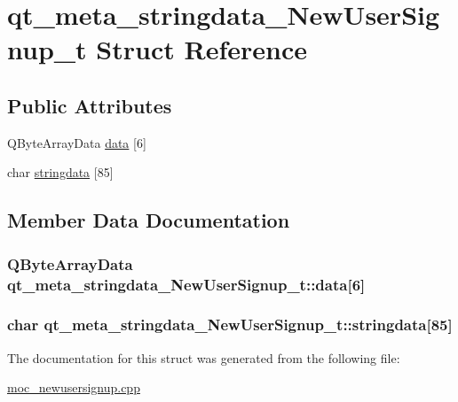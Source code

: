 \hypertarget{structqt__meta__stringdata__NewUserSignup__t}{\section{qt\-\_\-meta\-\_\-stringdata\-\_\-\-New\-User\-Signup\-\_\-t Struct Reference}
\label{structqt__meta__stringdata__NewUserSignup__t}
}
\subsection*{Public Attributes}
\begin{DoxyCompactItemize}
\item 
Q\-Byte\-Array\-Data \hyperlink{structqt__meta__stringdata__NewUserSignup__t_abeafb2c0efeaf10cb2608598ad40e627}{data} \mbox{[}6\mbox{]}
\item 
char \hyperlink{structqt__meta__stringdata__NewUserSignup__t_a0ab681dd35b54fa01c6ddd26c6aaa398}{stringdata} \mbox{[}85\mbox{]}
\end{DoxyCompactItemize}


\subsection{Member Data Documentation}
\hypertarget{structqt__meta__stringdata__NewUserSignup__t_abeafb2c0efeaf10cb2608598ad40e627}{
\subsubsection[{data}]{\setlength{\rightskip}{0pt plus 5cm}Q\-Byte\-Array\-Data qt\-\_\-meta\-\_\-stringdata\-\_\-\-New\-User\-Signup\-\_\-t\-::data\mbox{[}6\mbox{]}}}\label{structqt__meta__stringdata__NewUserSignup__t_abeafb2c0efeaf10cb2608598ad40e627}
\hypertarget{structqt__meta__stringdata__NewUserSignup__t_a0ab681dd35b54fa01c6ddd26c6aaa398}{
\subsubsection[{stringdata}]{\setlength{\rightskip}{0pt plus 5cm}char qt\-\_\-meta\-\_\-stringdata\-\_\-\-New\-User\-Signup\-\_\-t\-::stringdata\mbox{[}85\mbox{]}}}\label{structqt__meta__stringdata__NewUserSignup__t_a0ab681dd35b54fa01c6ddd26c6aaa398}


The documentation for this struct was generated from the following file\-:\begin{DoxyCompactItemize}
\item 
\hyperlink{moc__newusersignup_8cpp}{moc\-\_\-newusersignup.\-cpp}\end{DoxyCompactItemize}
